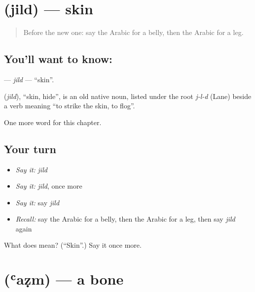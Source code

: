 \section[\texorpdfstring{\ar{جلد} (jild)}{جلد (jild)}]{ (jild) — skin}

\label{lesson:AR-C141-jild}



\begin{quote}
Before the new one: say the Arabic for a belly, then the Arabic for a leg.
\end{quote}

\subsection*{You'll want to know: }
\textbf{} — \emph{jild} — \textquotedblleft{}skin\textquotedblright{}.

\begin{cousinweb}
\textbf{} (\emph{jild}), \textquotedblleft{}skin, hide\textquotedblright{}, is an old native noun, listed under the root \emph{j-l-d} (Lane) beside a verb meaning \textquotedblleft{}to strike the skin, to flog\textquotedblright{}.
\end{cousinweb}

\begin{grammarlens}[title={What you've built}]
One more word for this chapter.
\end{grammarlens}

\subsection*{Your turn}
\begin{itemize}
\raggedright
  \item \emph{Say it:} \emph{jild}
  \item \emph{Say it:} \emph{jild}, once more
  \item \emph{Say it:} say \emph{jild}
  \item \emph{Recall:} say the Arabic for a belly, then the Arabic for a leg, then say \emph{jild} again
\end{itemize}

\begin{tcolorbox}[breakable,colback=teal!4,colframe=teal!35!black,title={Before you move on}]
What does  mean? (\textquotedblleft{}Skin\textquotedblright{}.) Say it once more.
\end{tcolorbox}
\section[\texorpdfstring{\ar{عظم} (ʿaẓm)}{عظم (ʿaẓm)}]{ (ʿaẓm) — a bone}

